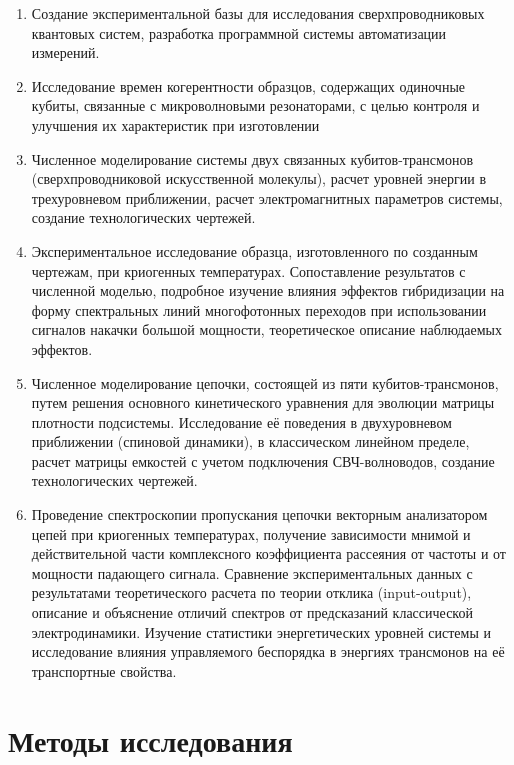 \documentclass[14pt, a4paper]{extreport}
\numberwithin{equation}{section}
\begin{document}
\begin{enumerate}
	\item Создание экспериментальной базы для исследования сверхпроводниковых квантовых систем, разработка программной системы автоматизации измерений.
	\item Исследование времен когерентности образцов, содержащих одиночные кубиты, связанные с микроволновыми резонаторами, с целью контроля и улучшения их характеристик при изготовлении
	\item Численное моделирование системы двух связанных кубитов\hyp трансмонов (сверхпроводниковой искусственной молекулы), расчет уровней энергии в трехуровневом приближении, расчет электромагнитных параметров системы, создание технологических чертежей.
	\item Экспериментальное исследование образца, изготовленного по созданным чертежам, при криогенных температурах. Сопоставление результатов с численной моделью, подробное изучение влияния эффектов гибридизации на форму спектральных линий многофотонных переходов при использовании сигналов накачки большой мощности, теоретическое описание наблюдаемых эффектов.
	\item Численное моделирование цепочки, состоящей из пяти кубитов\hyp трансмонов, путем решения основного кинетического уравнения для эволюции матрицы плотности подсистемы. Исследование её поведения в двухуровневом приближении (спиновой динамики), в классическом линейном пределе, расчет матрицы емкостей с учетом подключения СВЧ-волноводов, создание технологических чертежей.
	\item Проведение спектроскопии пропускания цепочки векторным анализатором цепей при криогенных температурах, получение зависимости мнимой и действительной части комплексного коэффициента рассеяния от частоты и от мощности падающего сигнала. Сравнение экспериментальных данных с результатами теоретического расчета по теории отклика (input\hyp output), описание и объяснение отличий спектров от предсказаний классической электродинамики. Изучение статистики энергетических уровней системы и исследование влияния управляемого беспорядка в энергиях трансмонов на её транспортные свойства.
\end{enumerate}


\section*{Методы исследования}
\end{document}
